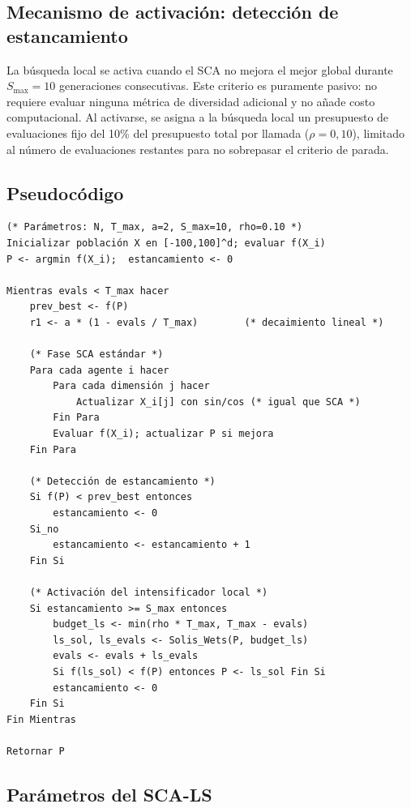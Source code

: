 \documentclass[12pt,a4paper]{article}
\begin{document}
\subsection{Mecanismo de activación: detección de estancamiento}
 
La búsqueda local se activa cuando el SCA no mejora el mejor global durante $S_{\max} = 10$ generaciones consecutivas. Este criterio es puramente pasivo: no requiere evaluar ninguna métrica de diversidad adicional y no añade costo computacional. Al activarse, se asigna a la búsqueda local un presupuesto de evaluaciones fijo del 10\% del presupuesto total por llamada ($\rho = 0{,}10$), limitado al número de evaluaciones restantes para no sobrepasar el criterio de parada.
 
\subsection{Pseudocódigo}
 
\begin{lstlisting}[caption={Pseudocódigo del SCA-LS (SCA + Solis-Wets)}, label={lst:sca_ls}]
(* Parámetros: N, T_max, a=2, S_max=10, rho=0.10 *)
Inicializar población X en [-100,100]^d; evaluar f(X_i)
P <- argmin f(X_i);  estancamiento <- 0
 
Mientras evals < T_max hacer
    prev_best <- f(P)
    r1 <- a * (1 - evals / T_max)        (* decaimiento lineal *)
 
    (* Fase SCA estándar *)
    Para cada agente i hacer
        Para cada dimensión j hacer
            Actualizar X_i[j] con sin/cos (* igual que SCA *)
        Fin Para
        Evaluar f(X_i); actualizar P si mejora
    Fin Para
 
    (* Detección de estancamiento *)
    Si f(P) < prev_best entonces
        estancamiento <- 0
    Si_no
        estancamiento <- estancamiento + 1
    Fin Si
 
    (* Activación del intensificador local *)
    Si estancamiento >= S_max entonces
        budget_ls <- min(rho * T_max, T_max - evals)
        ls_sol, ls_evals <- Solis_Wets(P, budget_ls)
        evals <- evals + ls_evals
        Si f(ls_sol) < f(P) entonces P <- ls_sol Fin Si
        estancamiento <- 0
    Fin Si
Fin Mientras
 
Retornar P
\end{lstlisting}
 
\subsection{Parámetros del SCA-LS}
 
\end{document}
